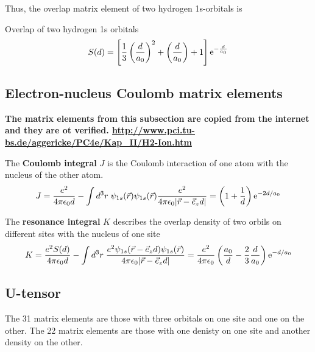 \documentclass[11pt,a4paper]{report}
\begin{document}
Thus, the overlap matrix element of two hydrogen 1s-orbitals is
\begin{myshadowminipage}{Overlap of two hydrogen 1s orbitals}
\begin{eqnarray}
S(d)=
\left[\frac{1}{3}\left(\frac{d}{a_0}\right)^2
+\left(\frac{d}{a_0}\right)+1\right]\mathrm{e}^{-\frac{d}{a_0}}
\end{eqnarray}
\end{myshadowminipage}

\subsection{Electron-nucleus Coulomb matrix elements}

\textbf{The matrix elements from this subsection are copied from the
  internet and they are ot
  verified. \url{http://www.pci.tu-bs.de/aggericke/PC4e/Kap_II/H2-Ion.htm}}

The \textbf{Coulomb integral} $J$ is the
Coulomb interaction of one atom with the nucleus of the other atom.
\begin{eqnarray}
J=\frac{e^2}{4\pi\epsilon_0d}
-\int d^3r\;\psi_{1s}(\vec{r})\psi_{1s}(\vec{r})\frac{e^2}{4\pi\epsilon_0|\vec{r}-\vec{e}_zd|}
=\left(1+\frac{1}{d}\right)\mathrm{e}^{-2d/a_0}
\end{eqnarray}

The \textbf{resonance integral} $K$ describes the overlap density of two orbils on different sites with the nucleus of one site
\begin{eqnarray}
K=\frac{e^2S(d)}{4\pi\epsilon_0d}
-\int d^3r\;
\frac{e^2\psi_{1s}(\vec{r}-\vec{e}_zd)\psi_{1s}(\vec{r})}
{4\pi\epsilon_0|\vec{r}-\vec{e}_zd|}
=\frac{e^2}{4\pi\epsilon_0}
\left(\frac{a_0}{d}-\frac{2}{3}\frac{d}{a_0}\right)\mathrm{e}^{-d/a_0}
\end{eqnarray}

\subsection{U-tensor}
The 31 matrix elements are those with three orbitals on one site and
one on the other. The 22 matrix elements are those with one denisty on
one site and another density on the other.
\end{document}
